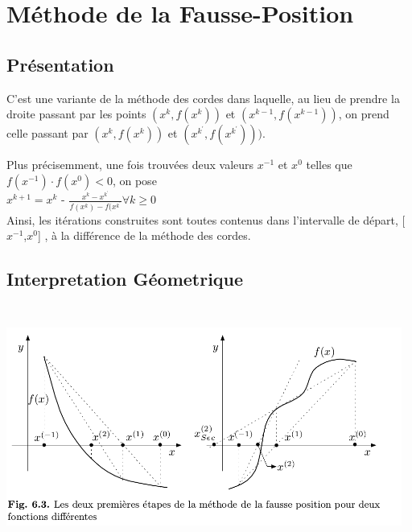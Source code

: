 \documentclass{article}
\begin{document}
\newpage
\section{Méthode de la Fausse-Position}
\subsection{Présentation} 
C’est une variante de la méthode des cordes dans laquelle, au lieu de prendre la droite passant par les points $ (x^k,f(x^k))$  et $(x^{k - 1}, f(x^{k - 1}))$, on prend celle passant par $(x^k,f(x^k))$ et $(x^k^{'},f(x^k^{'})))$.

Plus précisemment, une fois trouvées deux valeurs $x^{−1}$ et $x^0$ telles que $f(x^{−1})·f(x^0)< 0$, on pose \\
    $x^{k+1} = x^k$  -  $\frac{x^k - x^k^{'}}{f(x^k) -f(x^k^{'}}  \forall k \geq 0 $  \\
Ainsi, les itérations construites sont toutes contenus dans l'intervalle de départ, [$x^{-1}$,$x^0$] , à la différence de la méthode des cordes.

\subsection{Interpretation Géometrique}
\includegraphics[width=13cm,height=8cm]{img/interpretation/fausseposition.png}\\
\newpage
\end{document}
